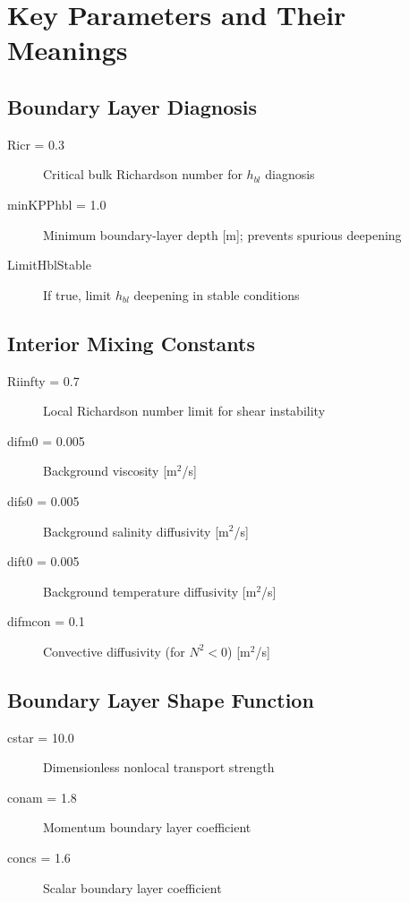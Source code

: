 \documentclass[11pt, a4paper]{article}
\begin{document}
\section{Key Parameters and Their Meanings}

\subsection{Boundary Layer Diagnosis}

\begin{description}
    \item[Ricr = 0.3] Critical bulk Richardson number for $h_{bl}$ diagnosis
    \item[minKPPhbl = 1.0] Minimum boundary-layer depth [m]; prevents spurious deepening
    \item[LimitHblStable] If true, limit $h_{bl}$ deepening in stable conditions
\end{description}

\subsection{Interior Mixing Constants}

\begin{description}
    \item[Riinfty = 0.7] Local Richardson number limit for shear instability
    \item[difm0 = 0.005] Background viscosity [m$^2$/s]
    \item[difs0 = 0.005] Background salinity diffusivity [m$^2$/s]
    \item[dift0 = 0.005] Background temperature diffusivity [m$^2$/s]
    \item[difmcon = 0.1] Convective diffusivity (for $N^2 < 0$) [m$^2$/s]
\end{description}

\subsection{Boundary Layer Shape Function}

\begin{description}
    \item[cstar = 10.0] Dimensionless nonlocal transport strength
    \item[conam = 1.8] Momentum boundary layer coefficient
    \item[concs = 1.6] Scalar boundary layer coefficient
\end{description}
\end{document}
